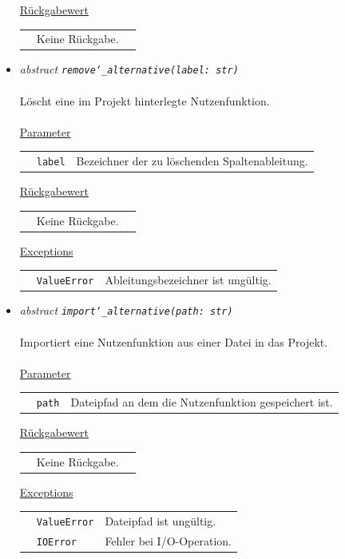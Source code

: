 \documentclass{article}
\begin{document}
\begin{itemize}
\underline{Rückgabewert}\\
\begin{tabular}{lll}
 & Keine Rückgabe.\\
\end{tabular}


\item \textit{\flqq{}abstract\frqq} \texttt{\textit{remove\char`_alternative(label: str)}}\\\\
Löscht eine im Projekt hinterlegte Nutzenfunktion.
\\\\
\underline{Parameter}\\
\begin{tabular}{lll}
 & \texttt{label} & Bezeichner der zu löschenden Spaltenableitung.\\
\end{tabular}

\underline{Rückgabewert}\\
\begin{tabular}{lll}
 & Keine Rückgabe.\\
\end{tabular}

\underline{Exceptions}\\
\begin{tabular}{lll}
 & \texttt{ValueError} & Ableitungsbezeichner ist ungültig.\\
\end{tabular}


\item \textit{\flqq{}abstract\frqq} \texttt{\textit{import\char`_alternative(path: str)}}\\\\
Importiert eine Nutzenfunktion aus einer Datei in das Projekt.
\\\\
\underline{Parameter}\\
\begin{tabular}{lll}
 & \texttt{path} & Dateipfad an dem die Nutzenfunktion gespeichert ist.\\
\end{tabular}

\underline{Rückgabewert}\\
\begin{tabular}{lll}
 & Keine Rückgabe.\\
\end{tabular}

\underline{Exceptions}\\
\begin{tabular}{lll}
 & \texttt{ValueError} & Dateipfad ist ungültig.\\
 & \texttt{IOError} & Fehler bei I/O-Operation.\\
\end{tabular}



\end{itemize}
\end{document}
